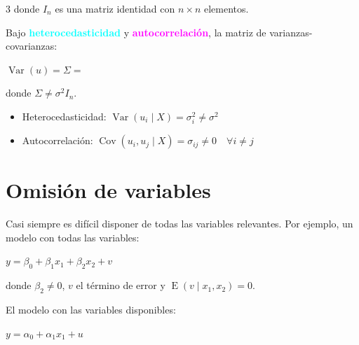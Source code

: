 \documentclass[10pt, a4paper, landscape]{article}
\DeclareMathOperator{\E}{E}
\DeclareMathOperator{\Var}{Var}
\DeclareMathOperator{\Cov}{Cov}
\begin{document}
\begin{multicols}{3}
\quad donde \( I_{n} \) es una matriz identidad con \( n \times n \) elementos.

Bajo \textcolor{cyan}{\textbf{heterocedasticidad}} y \textcolor{magenta}{\textbf{autocorrelación}}, la matriz de varianzas-covarianzas:

\begin{center}
	\( \Var(u) = \Sigma = \)
\end{center}

\quad donde \( \Sigma \neq \sigma^{2} I_{n} \).

\begin{itemize}[leftmargin=*]
	\item Heterocedasticidad: \( \Var(u_{i} \mid X) = \sigma_{i}^{2} \neq \sigma^{2} \)
	\item Autocorrelación: \( \Cov(u_{i}, u_{j} \mid X) = \sigma_{ij} \neq 0 \quad \forall i \neq j \)
\end{itemize}

\section*{Omisión de variables}

Casi siempre es difícil disponer de todas las variables relevantes. Por ejemplo, un modelo con todas las variables:

\begin{center}
	\( y = \beta_{0} + \beta_{1} x_{1} + \beta_{2} x_{2} + v \)
\end{center}

\quad donde \( \beta_{2} \neq 0 \), \( v \) el término de error y \( \E(v \mid x_{1}, x_{2}) = 0 \).

El modelo con las variables disponibles:

\begin{center}
	\( y = \alpha_{0} + \alpha_{1} x_{1} + u \)
\end{center}


\end{multicols}
\end{document}
